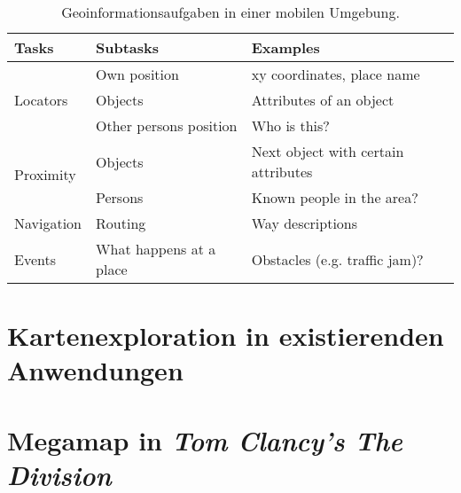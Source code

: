 \begin{table}[tbh]
    \centering
    \caption{Geoinformationsaufgaben in einer mobilen Umgebung. }
    \label{tab:gis_user_tasks}
    \begin{tabular}{@{}lll@{}}\toprule
        \textsf{\textbf{Tasks}} & \textsf{\textbf{Subtasks}} & \textsf{\textbf{Examples}}\\ \midrule
        \multirow{3}{*}{Locators} & Own position & xy coordinates, place name \\
                                  & Objects & Attributes of an object\\
                                  & Other persons position & Who is this?\\ \midrule
        \multirow{2}{*}{Proximity} & Objects & Next object with certain attributes\\
                                   & Persons & Known people in the area?\\ \midrule
        Navigation & Routing & Way descriptions\\ \midrule
        Events & What happens at a place & Obstacles (e.g. traffic jam)?\\ \bottomrule
    \end{tabular}
    \vspace{0.5em}
\end{table}

\section{Kartenexploration in existierenden Anwendungen}

\section{Megamap in \emph{Tom Clancy's The Division}}

%
\cleardoublepage

